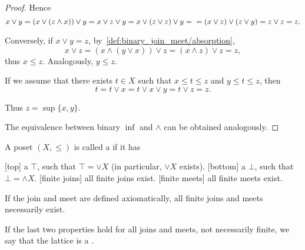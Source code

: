 \begin{proof}
  Hence
  \begin{equation*}
    x \vee y = (x \vee (z \wedge x)) \vee y = x \vee z \vee y = x \vee (z \vee z) \vee y = \\ = (x \vee z) \vee (z \vee y) = z \vee z = z.
  \end{equation*}

  Conversely, if \( x \vee y = z \), by~\ref{def:binary_join_meet/absorption},
  \begin{equation*}
    x \vee z = (x \wedge (y \vee x)) \vee z = (x \wedge z) \vee z = z,
  \end{equation*}
  thus \( x \leq z \). Analogously, \( y \leq z \).

  If we assume that there exists \( t \in X \) such that \( x \leq t \leq z \) and \( y \leq t \leq z \), then
  \begin{equation*}
    t = t \vee x = t \vee x \vee y = t \vee z = z.
  \end{equation*}

  Thus \( z = \sup \{ x, y \} \).

  The equivalence between binary \( \inf \) and \( \wedge \) can be obtained analogously.
\end{proof}

\begin{definition}\label{def:lattice}
  A poset \( (X, \leq) \) is called a  if it has
  \begin{description}
    [top] a  \( \top \), such that \( \top = \vee X \) (in particular, \( \vee X \) exists).
    [bottom] a  \( \bot \), such that \( \bot = \wedge X \).
    [finite joins] all finite joins exist.
    [finite meets] all finite meets exist.
  \end{description}

  If the join and meet are defined axiomatically, all finite joins and meets necessarily exist.

  If the last two properties hold for all joins and meets, not necessarily finite, we say that the lattice is a .
\end{definition}

